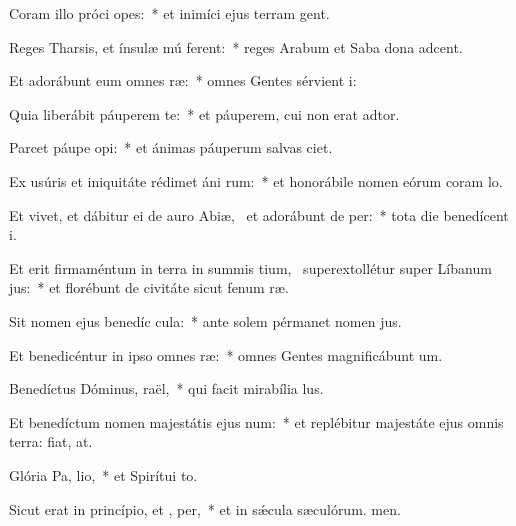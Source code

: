\item Coram illo próci opes:~* et inimíci ejus terram gent.
\item Reges Tharsis, et ínsulæ mú ferent:~* reges Arabum et Saba dona adcent.
\item Et adorábunt eum omnes  ræ:~* omnes Gentes sérvient i:
\item Quia liberábit páuperem  te:~* et páuperem, cui non erat adtor.
\item Parcet páupe  opi:~* et ánimas páuperum salvas ciet.
\item Ex usúris et iniquitáte rédimet áni rum:~* et honorábile nomen eórum coram lo.
\item Et vivet, et dábitur ei de auro Abiæ,~\pscross{} et adorábunt de  per:~* tota die benedícent i.
\item Et erit firmaméntum in terra in summis tium,~\pscross{} superextollétur super Líbanum  jus:~* et florébunt de civitáte sicut fenum ræ.
\item Sit nomen ejus benedíc  cula:~* ante solem pérmanet nomen jus.
\item Et benedicéntur in ipso omnes  ræ:~* omnes Gentes magnificábunt um.
\item Benedíctus Dóminus,  raël,~* qui facit mirabília lus.
\item Et benedíctum nomen majestátis ejus  num:~* et replébitur majestáte ejus omnis terra: fiat, at.
\item Glória Pa,  lio,~* et Spirítui to.
\item Sicut erat in princípio, et ,  per,~* et in sǽcula sæculórum. men.
